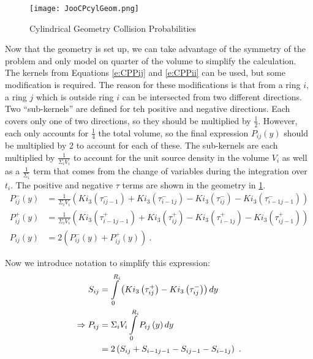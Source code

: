\begin{figure}[h]
  \centering
  \texttt{[image: JooCPcylGeom.png]}
  \caption[Cylindrical Geometry Collision Probabilities]{Cylindrical Geometry Collision Probabilities \cite{NERS561CPNotes}}\label{f:CPcylGeom}
\end{figure}

Now that the geometry is set up, we can take advantage of the symmetry of the problem and only model on quarter of the volume to simplify the calculation.  The kernels from Equations \ref{e:CPPij} and \ref{e:CPPii} can be used, but some modification is required.  The reason for these modifications is that from a ring $i$, a ring $j$ which is outside ring $i$ can be intersected from two different directions.  Two ``sub-kernels'' are defined for teh positive and negative directions.  Each covers only one of two directions, so they should be multiplied by $\frac{1}{2}$.  However, each only accounts for $\frac{1}{4}$ the total volume, so the final expression $P_{ij}\left(y\right)$ should be multiplied by 2 to account for each of these.  The sub-kernels are each multiplied by $\frac{1}{\Sigma_i V_i}$ to account for the unit source density in the volume $V_i$ as well as a $\frac{1}{\Sigma_i}$ term that comes from the change of variables during the integration over $t_i$.  The positive and negative $\tau$ terms are shown in the geometry in \ref{f:CPcylGeom}.
\begin{subequations}\label{e:CPcylPij(y)}
  \begin{align}
  P_{ij}^-\left(y\right) &= \frac{1}{\Sigma_i V_i} \left(Ki_3\left(\tau_{ij-1}^-\right) + Ki_3\left(\tau_{i-1j}^-\right) - Ki_3\left(\tau_{ij}^-\right) - Ki_3\left(\tau_{i-1j-1}^-\right)\right) \\
  P_{ij}^+\left(y\right) &= \frac{1}{\Sigma_i V_i} \left(Ki_3\left(\tau_{i-1j-1}^+\right) + Ki_3\left(\tau_{ij}^+\right) - Ki_3\left(\tau_{i-1j}^+\right) - Ki_3\left(\tau_{ij-1}^+\right)\right) \\
  P_{ij}\left(y\right) &= 2\left(P_{ij}^-\left(y\right) + P_{ij}^+\left(y\right)\right)\ .
  \end{align}
\end{subequations}

Now we introduce notation to simplify this expression:
\begin{subequations}\label{e:CPcypPij}
  \begin{align}
  S_{ij} &= \intop_0^{R_i} \left(Ki_3\left(\tau_{ij}^+\right) - Ki_3\left(\tau_{ij}^-\right)\right)dy \\
  \Rightarrow P_{ij} &= \Sigma_i V_i \intop_0^{R_i} P_{ij}\left(y\right)dy \nonumber \\
  &= 2\left(S_{ij} + S_{i-1j-1} - S_{ij-1} - S_{i-1j}\right)\ .
  \end{align}
\end{subequations}

